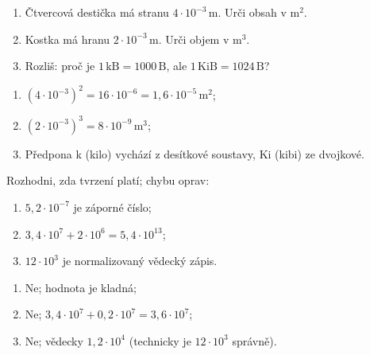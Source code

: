 \documentclass[11pt,a4paper]{article}
\begin{document}
\begin{zadaniReseniBox}[breakable=false,title={Rozšiřující příklad 1: kontrola jednotek a řádu}]
\begin{enumerate}[label=\alph*)]
\item Čtvercová destička má stranu $4\cdot10^{-3}\,\mathrm m$. Urči obsah v $\mathrm{m^2}$.
\item Kostka má hranu $2\cdot10^{-3}\,\mathrm m$. Urči objem v $\mathrm{m^3}$.
\item Rozliš: proč je $1\,\mathrm{kB}=1000\,\mathrm B$, ale $1\,\mathrm{KiB}=1024\,\mathrm B$?
\end{enumerate}
\tcblower
\begin{enumerate}[label=\alph*)]
\item $(4\cdot10^{-3})^2=16\cdot10^{-6}=\boxed{1{,}6\cdot10^{-5}\,\mathrm{m^2}}$;
\item $(2\cdot10^{-3})^3=8\cdot10^{-9}\,\mathrm{m^3}$;
\item Předpona k (kilo) vychází z desítkové soustavy, Ki (kibi) ze dvojkové.
\end{enumerate}
\end{zadaniReseniBox}
\begin{zadaniReseniBox}[breakable=false,title={Rozšiřující příklad 2: časté omyly}]
Rozhodni, zda tvrzení platí; chybu oprav:
\begin{enumerate}[label=\alph*)]
\item $5{,}2\cdot10^{-7}$ je záporné číslo;
\item $3{,}4\cdot10^7+2\cdot10^6=5{,}4\cdot10^{13}$;
\item $12\cdot10^3$ je normalizovaný vědecký zápis.
\end{enumerate}
\tcblower
\begin{enumerate}[label=\alph*)]
\item Ne; hodnota je kladná;
\item Ne; $3{,}4\cdot10^7+0{,}2\cdot10^7=3{,}6\cdot10^7$;
\item Ne; vědecky $1{,}2\cdot10^4$ (technicky je $12\cdot10^3$ správně).
\end{enumerate}
\end{zadaniReseniBox}
\end{document}
